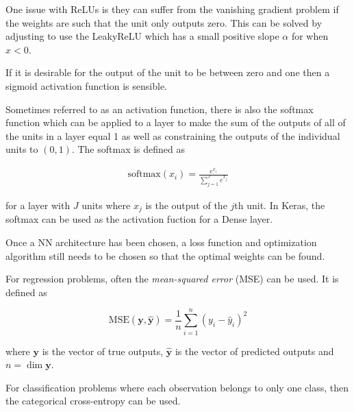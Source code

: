 \documentclass[a4paper,twocolumn]{article}
\newcommand{\softmax}[1]{\text{softmax}(#1)}
\newcommand{\mse}[1]{\text{MSE}(#1)}
\begin{document}
One issue with ReLUs is they can suffer from the vanishing gradient problem if the weights are such that the unit only outputs zero. This can be solved by adjusting to use the LeakyReLU which has a small positive slope $\alpha$ for when $x<0$.

If it is desirable for the output of the unit to be between zero and one then a sigmoid activation function is sensible.

Sometimes referred to as an activation function, there is also the softmax function which can be applied to a layer to make the sum of the outputs of all of the units in a layer equal 1 as well as constraining the outputs of the individual units to $(0, 1)$. The softmax is defined as 

$$
\begin{aligned}
\softmax {x_i} = \frac{e^{x_i}}{\sum_{j=1}^J e^{x_j}}
\end{aligned}
$$

for a layer with $J$ units where $x_j$ is the output of the $j$th unit. In Keras, the softmax can be used as the activation fuction for a Dense layer.

Once a NN architecture has been chosen, a loss function and optimization algorithm still needs to be chosen so that the optimal weights can be found.

For regression problems, often the \emph{mean-squared error} (MSE) can be used. It is defined as

$$
\mse {\mathbf{y}, \hat{\mathbf{y}}} = \frac{1}{n} \sum_{i=1}^n (y_i - \hat{y}_i)^2
$$

where $\mathbf{y}$ is the vector of true outputs, $\hat{\mathbf{y}}$ is the vector of predicted outputs and $n = \dim \mathbf{y}$.

For classification problems where each observation belongs to only one class, then the categorical cross-entropy can be used.
\end{document}
